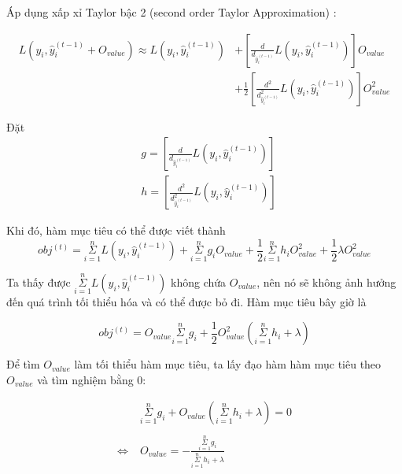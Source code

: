     Áp dụng xấp xỉ Taylor bậc 2 (second order Taylor Approximation) \cite{Taylor_theorem}:
    
    \begin{equation}
    \begin{split}
        L(y_{i}, \hat{y}_{i}^{(t-1)} + O_{value}) \approx 
        L(y_{i}, \hat{y}_{i}^{(t-1)})
        & + \left[ \frac{d}{ d_{\hat{y}_{i}^{(t-1)}}}  L(y_{i}, \hat{y}_{i}^{(t-1)}) \right] O_{value} \\
        & + \frac{1}{2} \left[ \frac{d^{2}}{d^{2}_{\hat{y}_{i}^{(t-1)}}}  L(y_{i}, \hat{y}_{i}^{(t-1)}) \right] O^2_{value}
    \end{split}
    \end{equation}
    
    Đặt
    \begin{equation}
    \begin{split}
        & g = \left[ \frac{d}{ d_{\hat{y}_{i}^{(t-1)}}}  L(y_{i}, \hat{y}_{i}^{(t-1)}) \right]
        \\
        & h = \left[ \frac{d^{2}}{d^{2}_{\hat{y}_{i}^{(t-1)}}}  L(y_{i}, \hat{y}_{i}^{(t-1)}) \right]
    \end{split}
    \end{equation}
    
    Khi đó, hàm mục tiêu có thể được viết thành 
    \begin{equation}
        obj^{(t)} = \underset{i=1}{\overset{n}{\Sigma}} L(y_{i}, \hat{y}_{i}^{(t-1)})
        + \underset{i=1}{\overset{n}{\Sigma}} g_{i} O_{value}
        + \frac{1}{2} \underset{i=1}{\overset{n}{\Sigma}} h_{i} O^2_{value}
        + \frac{1}{2} \lambda O^2_{value}
    \end{equation}
    
    Ta thấy được $\underset{i=1}{\overset{n}{\Sigma}} L(y_{i}, \hat{y}_{i}^{(t-1)}) $ không chứa $O_{value}$, nên nó sẽ không ảnh hưởng đến quá trình tối thiểu hóa và có thể được bỏ đi. Hàm mục tiêu bây giờ là
    
    \begin{equation} \label{obj_func}
         obj^{(t)} = O_{value} \underset{i=1}{\overset{n}{\Sigma}} g_{i}
         + \frac{1}{2} O^2_{value} (\underset{i=1}{\overset{n}{\Sigma}} h_{i} + \lambda)
    \end{equation}
    
    Để tìm $O_{value}$ làm tối thiểu hàm mục tiêu, ta lấy đạo hàm hàm mục tiêu theo $O_{value}$ và tìm nghiệm bằng 0:
    
    \begin{equation} \label{eq_Ovalue}
        \begin{split}
            & \underset{i=1}{\overset{n}{\Sigma}} g_{i}
            + O_{value} (\underset{i=1}{\overset{n}{\Sigma}}h_{i} + \lambda) = 0 \\ \\
           	\Leftrightarrow \; &  O_{value} = - \frac{\underset{i=1}{\overset{n}{\Sigma}} g_{i}} {\underset{i=1}{\overset{n}{\Sigma}}h_{i} + \lambda}
        \end{split}
    \end{equation}
    
